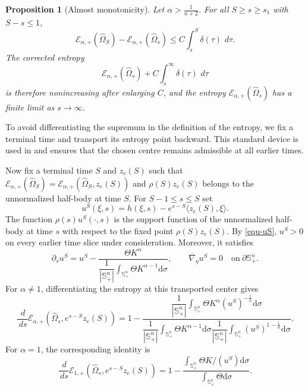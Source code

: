 \documentclass[11pt, reqno]{amsart}
\newtheorem{proposition}[theorem]{Proposition}
\theoremstyle{remark}
\theoremstyle{definition}
\numberwithin{equation}{section}
\newcommand{\cE}{\mathcal E}
\newcommand{\dd}{\,d}
\begin{document}
\begin{proposition}[Almost monotonicity]\label{thm:almost-monotonicity-alpha}
Let $\alpha>\frac{1}{n+2}$.  For all $S\ge s\ge s_1$ with $S-s\le1$,
\begin{equation}\label{eq:two-time-entropy-inequality}
\cE_{\alpha,+}(\widehat\Omega_{S})
-\cE_{\alpha,+}(\widehat\Omega_{s})
\le C\int_{s}^{S}\delta(\tau)\,\dd\tau.
\end{equation}
The corrected entropy
\begin{equation}\label{eq:corrected-entropy}
        \mathcal{E}_{\alpha,+}(\hat{\Omega}_s) +C\int_s^\infty\delta(\tau)\,\dd\tau
\end{equation}
is therefore nonincreasing after enlarging $C$, and the entropy $\cE_{\alpha,+}(\widehat{\Omega}_s)$ has a finite limit as $s\to\infty$.
\end{proposition}

To avoid differentiating the supremum in the definition of the entropy, we fix a terminal time and transport its entropy point backward. This standard device is used in \cite{GN17,AGN2016,CH2024} and ensures that the chosen centre remains admissible at all earlier times.

Now fix a terminal time $S$ and $z_e(S)$ such that $\mathcal{E}_{\alpha,+}(\hat{\Omega}_S)= \mathcal{E}_{\alpha,+}(\hat{\Omega}_S,z_e(S))$ and $\rho(S)z_e(S)$ belongs to the unnormalized half-body at time $S$.  For $S-1 \leq s\le S$ set
\begin{equation}\label{eq:transported-support}
        u^{S}(\xi,s)
        =h(\xi,s)-e^{s-S}\langle z_e(S),\xi\rangle.
\end{equation}
The function $\rho(s)u^{S}(\cdot,s)$ is the
support function of the unnormalized half-body at time $s$ with respect to the fixed point $\rho(S)z_e(S)$. By \eqref{equ-uS}, $u^{S}>0$ on every earlier time slice under consideration. Moreover, it satisfies
\begin{equation*}
        \partial_su^{S}=u^{S}-\dfrac{\Theta K^{\alpha}}{\dfrac{1}{|\mathbb{S}_+^n|}\displaystyle\int_{\mathbb{S}_+^n}\Theta K^{\alpha-1}\mathrm{d}\sigma},
        \qquad \overline{\nabla}_\eta u^{S}=0\quad \text{on}~\partial\mathbb{S}^n_+.
\end{equation*}
For $\alpha\ne1$, differentiating the entropy at this transported center gives
\begin{equation}\label{eq:transported-entropy-derivative}
\frac{\dd}{\dd s}
\cE_{\alpha,+}(\widehat\Omega_s,e^{s-S}z_e(S)) = 1-
\frac{\dfrac{1}{|\mathbb{S}_+^n|}\displaystyle\int_{\mathbb{S}_+^n}\Theta K^\alpha (u^{S})^{-\frac{1}{\alpha}}\mathrm{d}\sigma}
     {\dfrac{1}{|\mathbb{S}_+^n|}\displaystyle\int_{\mathbb{S}_+^n}\Theta K^{\alpha-1}\mathrm{d}\sigma
      \dfrac{1}{|\mathbb{S}_+^n|}\displaystyle\int_{\mathbb{S}_+^n}(u^{S})^{1-\frac{1}{\alpha}}\mathrm{d}\sigma}.
\end{equation}
For $\alpha=1$, the corresponding identity is
\begin{equation}\label{eq:transported-entropy-derivative-one}
\frac{\dd}{\dd s}
\mathcal{E}_{1,+}(\widehat\Omega_s,e^{s-S}z_e(S))
=1-\frac{\displaystyle\int_{\mathbb{S}_+^n}\Theta K/(u^{S})\mathrm{d}\sigma}{\displaystyle\int_{\mathbb{S}_+^n}\Theta \mathrm{d}\sigma}.
\end{equation}
\end{document}
